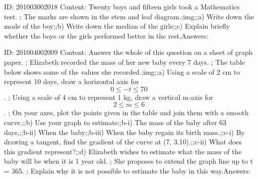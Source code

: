 \documentclass{article}
\begin{document}
ID: 201003002018
Content:
Twenty boys and fifteen girls took a Mathematics test. ; The marks are shown in the stem and leaf diagram.;img;;a) Write down the mode of the boy;;b) Write down the median of the girls;;c) Explain briefly whether the boys or the girls performed better in the rest.Answers:

ID: 201004002009
Content:
Answer the whole of this question on a sheet of graph paper. ; Elizabeth recorded the mass of her new baby every 7 days. ; The table below shows some of the values she recorded.;img;;a) Using a scale of 2 cm to represent 10 days, draw a horizontal axis for $$0 \leq -t \leq 70$$. ; Using a scale of 4 cm to represent 1 kg, draw a vertical m-axis for $$2 \leq m \leq 6$$. ; On your axes, plot the points given in the table and join them with a smooth curve.;;b) Use your graph to estimate;;b-i) The mass of the baby after 63 days,;;b-ii) When the baby;;b-iii) When the baby regain its birth mass.;;c-i) By drawing a tangent, find the gradient of the curve at (7, 3.10).;;c-ii) What does this gradient represent?;;d) Elizabeth wishes to estimate what the mass of the baby will be when it is 1 year old. ; She proposes to extend the graph line up to t = 365. ; Explain why it is not possible to estimate the baby in this way.Answers:
\end{document}
